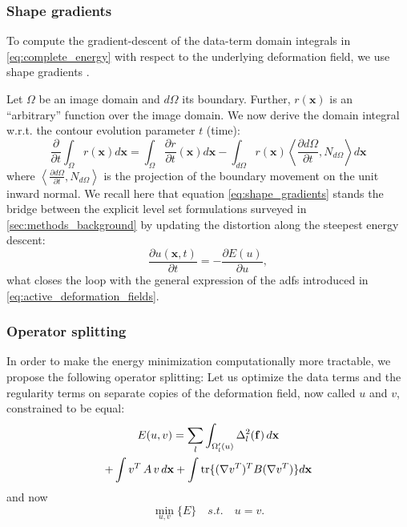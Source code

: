 \subsubsection{Shape gradients}
To compute the gradient-descent of the data-term domain integrals
in \eqref{eq:complete_energy} with respect to the underlying 
deformation field, we use shape gradients 
\cite{jehan-besson_dream2s:_2003,herbulot_segmentation_2006}.

Let $\Omega$ be an image domain and $d\Omega$ its boundary. Further, 
$r(\mathbf{x})$ is an ``arbitrary'' function over the image domain. 
We now derive the domain integral w.r.t. the contour evolution 
parameter $t$ (time):
\begin{equation}
\frac{\partial}{\partial t} \int_\Omega r(\mathbf{x}) d\mathbf{x} = \int_\Omega \frac{\partial r}{\partial t}(\mathbf{x}) d\mathbf{x} - \int_{d\Omega} r(\mathbf{x}) \left\langle \frac{\partial{d\Omega}}{\partial t}, N_{d\Omega}\right\rangle d\mathbf{x}
\label{eq:shape_gradients}
\end{equation}
where $\left\langle\frac{\partial{d\Omega}}{\partial t}, N_{d\Omega}\right\rangle$ is 
the projection of the boundary movement on the unit inward normal. We recall
here that equation \eqref{eq:shape_gradients} stands the bridge between the 
explicit level set formulations surveyed in \autoref{sec:methods_background}
by updating the distortion along the steepest energy descent:
\begin{equation}
\frac{\partial u(\mathbf{x},t)}{\partial t} = - \frac{\partial E(u)}{\partial u},
\end{equation}
what closes the loop with the general expression of the \glspl{adf} introduced in
\eqref{eq:active_deformation_fields}.

\subsubsection{Operator splitting}
In order to make the energy minimization computationally more tractable, 
we propose the following operator splitting: Let us optimize the data terms 
and the regularity terms on separate copies of the deformation field, 
now called $u$ and $v$, constrained to be equal:
\begin{multline}
E(u,v) = \sum\limits_l \int_{\Omega'_l(u)} \Delta^2_l (\mathbf{f}) \,d\mathbf{x} \\
+ \int v^T \, A \, v \, d\mathbf{x} + \int \tr\{(\nabla v^T)^T B (\nabla v^T)\} d\mathbf{x}
\label{eq:operator_splitting}
\end{multline}
and now
\begin{equation}
\min_{u,v} \{ E \} \quad s.t. \quad u = v.
\end{equation}

